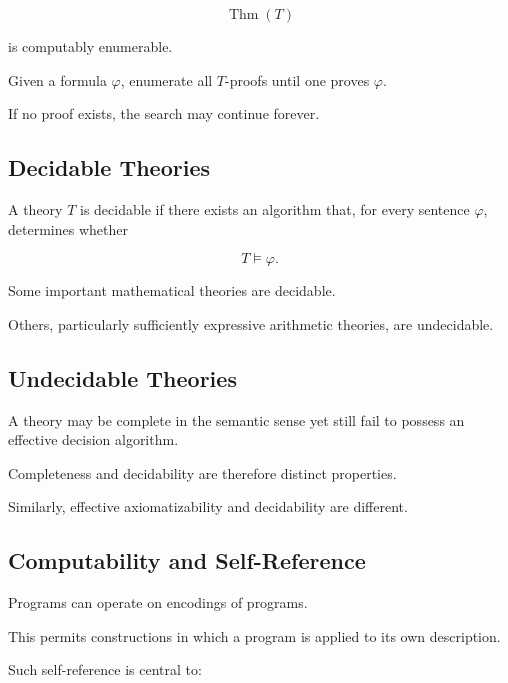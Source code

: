 \[
\boxed{
\operatorname{Thm}(T)
}
\]

is computably enumerable.

Given a formula \(\varphi\), enumerate all \(T\)-proofs until one proves
\(\varphi\).

If no proof exists, the search may continue forever.

\subsection{Decidable Theories}
\label{subsec:decidable-theories-computability}

A theory \(T\) is decidable if there exists an algorithm that, for every
sentence \(\varphi\), determines whether

\[
\boxed{
T\models\varphi.
}
\]

Some important mathematical theories are decidable.

Others, particularly sufficiently expressive arithmetic theories, are
undecidable.

\subsection{Undecidable Theories}
\label{subsec:undecidable-theories}

A theory may be complete in the semantic sense yet still fail to possess an
effective decision algorithm.

Completeness and decidability are therefore distinct properties.

Similarly, effective axiomatizability and decidability are different.

\subsection{Computability and Self-Reference}
\label{subsec:computability-self-reference}

Programs can operate on encodings of programs.

This permits constructions in which a program is applied to its own
description.

Such self-reference is central to:

